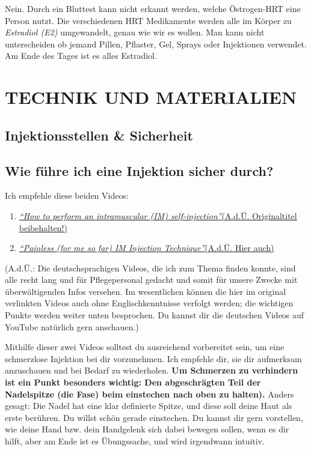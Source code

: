 \documentclass{article}
\begin{document}
Nein. Durch ein Bluttest kann nicht erkannt werden, welche Östrogen-HRT eine Person nutzt. Die verschiedenen HRT Medikamente werden alle im Körper zu \textit{Estradiol (E2)} umgewandelt, genau wie wir es wollen. Man kann nicht unterscheiden ob jemand Pillen, Pflaster, Gel, Sprays oder Injektionen verwendet. Am Ende des Tages ist es alles Estradiol.

 

\section{TECHNIK UND MATERIALIEN} \label{ts}

\subsection*{Injektionsstellen \& Sicherheit}

\subsection{Wie führe ich eine Injektion sicher durch?}

Ich empfehle diese beiden Videos:

\begin{enumerate}
  \item \href{https://www.youtube.com/watch?v=cBabaGC2Dok}{\textit{“How to perform an intramuscular (IM) self-injection”}(A.d.Ü. Originaltitel beibehalten!)}
  \item \href{https://www.youtube.com/watch?v=YfNlAZLxLyw}{\textit{“Painless (for me so far) IM Injection Technique”}(A.d.Ü. Hier auch)}
\end{enumerate}

(A.d.Ü.: Die deutschsprachigen Videos, die ich zum Thema finden konnte, sind alle recht lang und für Pflegepersonal gedacht und somit für unsere Zwecke mit überwältigenden Infos versehen. Im wesentlichen können die hier im original verlinkten Videos auch ohne Englischkenntnisse verfolgt werden; die wichtigen Punkte werden weiter unten besprochen. Du kannst dir die deutschen Videos auf YouTube natürlich gern anschauen.) 

Mithilfe dieser zwei Videos solltest du ausreichend vorbereitet sein, um eine schmerzlose Injektion bei dir vorzunehmen. Ich empfehle dir, sie dir aufmerksam anzuschauen und bei Bedarf zu wiederholen. \textbf{Um Schmerzen zu verhindern ist ein Punkt besonders wichtig: Den abgeschrägten Teil der Nadelspitze (die Fase) beim einstechen nach oben zu halten).} Anders gesagt: Die Nadel hat eine klar definierte Spitze, und diese soll deine Haut als erste berühren. Du willst schön gerade einstechen. Du kannst dir gern vorstellen, wie deine Hand bzw. dein Handgelenk sich dabei bewegen sollen, wenn es dir hilft, aber am Ende ist es Übungssache, und wird irgendwann intuitiv.
\end{document}

